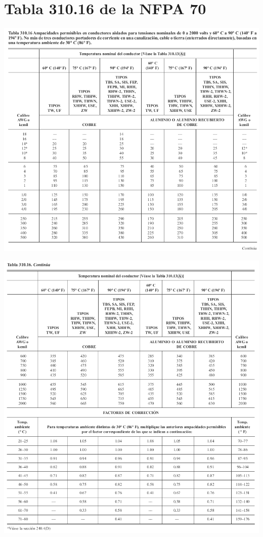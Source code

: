 \chapter{Tabla 310.16 de la NFPA 70}
\label{B}

\includegraphics[width=1\textwidth]{./imagenes/cable1.png} 

\includegraphics[width=1\textwidth]{./imagenes/cable2.png} 